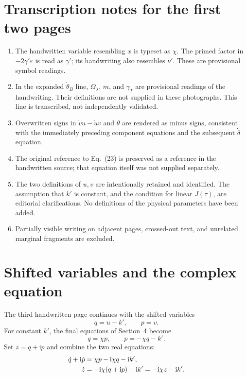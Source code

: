 \documentclass[11pt,a4paper]{article}
\begin{document}
\section*{Transcription notes for the first two pages}
\begin{enumerate}
\item The handwritten variable resembling $x$ is typeset as $\chi$.
The primed factor in $-2\gamma'\varepsilon$ is read as $\gamma'$;
its handwriting also resembles $\nu'$. These are provisional symbol readings.
\item In the expanded $\dot\theta_B$ line, $\Omega_\lambda$, $m$, and
$\gamma_T$ are provisional readings of the handwriting. Their definitions
are not supplied in these photographs. This line is transcribed, not
independently validated.
\item Overwritten signs in $\dot v u-\dot u v$ and $\dot\theta$
are rendered as minus signs, consistent with the immediately preceding
component equations and the subsequent $\dot\delta$ equation.
\item The original reference to Eq.~(23) is preserved as a reference in the
handwritten source; that equation itself was not supplied separately.
\item The two definitions of $u,v$ are intentionally retained and identified.
The assumption that $k'$ is constant, and the condition for linear $J(\tau)$,
are editorial clarifications. No definitions of the physical parameters
have been added.
\item Partially visible writing on adjacent pages, crossed-out text, and
unrelated marginal fragments are excluded.
\end{enumerate}
\newpage
\section{Shifted variables and the complex equation}
The third handwritten page continues with the shifted variables
\begin{equation}
q=u-k',\qquad p=v.
\end{equation}
For constant $k'$, the final equations of Section~4 become
\begin{equation}
\boxed{\dot q=\chi p,\qquad \dot p=-\chi q-k'.}
\end{equation}
Set $z=q+\mathrm{i}p$ and combine the two real equations:
\begin{align}
\dot q+\mathrm{i}\dot p
&=\chi p-\mathrm{i}\chi q-\mathrm{i}k',\notag\\
\dot z&=-\mathrm{i}\chi(q+\mathrm{i}p)-\mathrm{i}k'
=-\mathrm{i}\chi z-\mathrm{i}k'.
\label{eq:complex}
\end{align}
\end{document}
